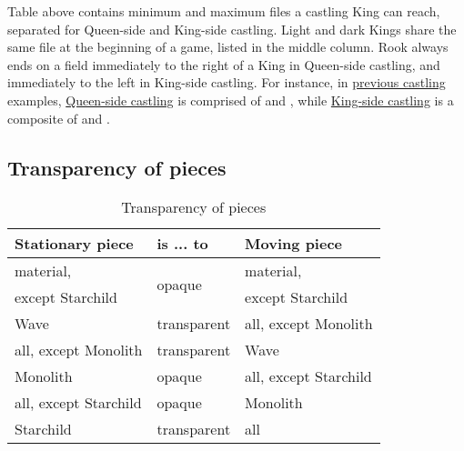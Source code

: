 Table above contains minimum and maximum files a castling King can reach, separated
for Queen-side and King-side castling. Light and dark Kings share the same file at
the beginning of a game, listed in the middle column.\newline
\indent
Rook always ends on a field immediately to the right of a King in Queen-side castling,
and immediately to the left in King-side castling.\newline
\indent
For instance, in
\hyperref[sec:Appendix/Notation/Castling]{previous castling} examples,
\hyperref[fig:age_of_aquarius_castling_left_00_04]{Queen-side castling}
 is comprised of  and , while
\hyperref[fig:one_castling_right_24_04]{King-side castling}  is a
composite of  and .

\clearpage %

\subsection*{Transparency of pieces}
\label{sec:Appendix/Summary/Transparency of pieces}

\begin{table}[!h]
\centering
\begin{tabular}{ lll }
\toprule %
\textbf{Stationary piece}           & \textbf{is ... to}            & \textbf{Moving piece}         \\
\midrule %
material\footnotemark[1],           & \multirow{2}{*}{opaque}       & material\footnotemark[1],     \\
except Starchild                    &                               & except Starchild              \\
\cmidrule{1-3} %
Wave                                & transparent                   & all, except Monolith          \\
all, except Monolith                & transparent                   & Wave                          \\
Monolith                            & opaque                        & all, except Starchild         \\
all, except Starchild               & opaque                        & Monolith                      \\
Starchild                           & transparent                   & all                           \\
\bottomrule %
\end{tabular}
\caption{Transparency of pieces}
\label{tbl:Appendix/Summary/Transparency of pieces}
\end{table}

